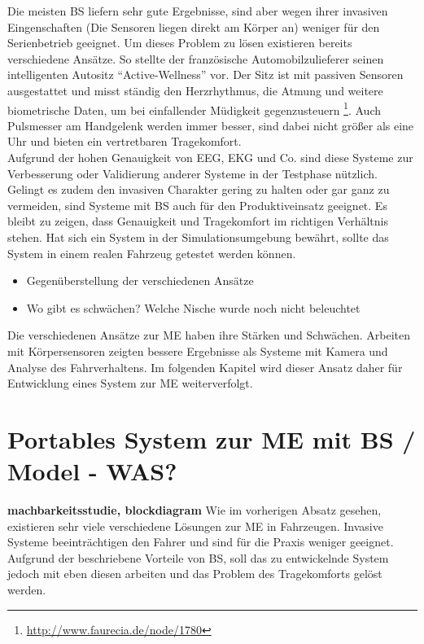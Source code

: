 {Die meisten \acl{BS} liefern sehr gute Ergebnisse, sind aber wegen ihrer invasiven Eingenschaften (Die Sensoren liegen direkt am Körper an) weniger für den Serienbetrieb geeignet. Um dieses Problem zu lösen existieren bereits verschiedene Ansätze. So stellte der französische Automobilzulieferer seinen intelligenten Autositz "`Active-Wellness"' vor. Der Sitz ist mit passiven Sensoren ausgestattet und misst ständig den Herzrhythmus, die Atmung und weitere biometrische Daten, um bei einfallender Müdigkeit gegenzusteuern \footnote{\url{http://www.faurecia.de/node/1780}}. Auch Pulsmesser am Handgelenk werden immer besser, sind dabei nicht größer als eine Uhr und bieten ein vertretbaren Tragekomfort. \\

Aufgrund der hohen Genauigkeit von EEG, EKG und Co. sind diese Systeme zur Verbesserung oder Validierung anderer Systeme in der Testphase nützlich. Gelingt es zudem den invasiven Charakter gering zu halten oder gar ganz zu vermeiden, sind Systeme mit \acl{BS} auch für den Produktiveinsatz geeignet. Es bleibt zu zeigen, dass Genauigkeit und Tragekomfort im richtigen Verhältnis stehen. Hat sich ein System in der Simulationsumgebung bewährt, sollte das System in einem realen Fahrzeug getestet werden können.  \\

\begin{itemize}
  \item Gegenüberstellung der verschiedenen Ansätze
  \item Wo gibt es schwächen? Welche Nische wurde noch nicht beleuchtet
\end{itemize}

Die verschiedenen Ansätze zur \acl{ME} haben ihre Stärken und Schwächen. Arbeiten mit Körpersensoren zeigten bessere Ergebnisse als Systeme mit Kamera und Analyse des Fahrverhaltens. Im folgenden Kapitel wird dieser Ansatz daher für Entwicklung eines System zur \acl{ME} weiterverfolgt.

\section{Portables System zur \acl{ME} mit \acl{BS} / Model - WAS?}
\label{chap:prop}
\textbf{machbarkeitsstudie, blockdiagram}
Wie im vorherigen Absatz gesehen, existieren sehr viele verschiedene Lösungen zur \acl{ME} in Fahrzeugen. Invasive Systeme beeinträchtigen den Fahrer und sind für die Praxis weniger geeignet. Aufgrund der beschriebene Vorteile von \acl{BS}, soll das zu entwickelnde System jedoch mit eben diesen arbeiten und das Problem des Tragekomforts gelöst werden.\\

}
